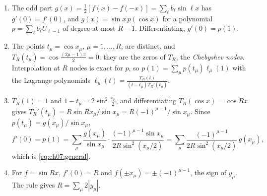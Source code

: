 \documentclass[handoutsbeamer.tex]{subfiles}
\begin{document}
\begin{frame}
\onp{\footnotesize}

\begin{enumerate}\setlength\itemsep{0.2em}
    \item The odd part $g(x) = \frac12[f(x)-f(-x)] = \sum_\ell b_\ell\sin\ell x$ has $g'(0) = f'(0)$, and $g(x) = \sin x\,p(\cos x)$ for a polynomial $p = \sum_\ell b_\ell U_{\ell-1}$ of degree at most $R-1$. Differentiating, $g'(0) = p(1)$.
    \item The points $t_\mu = \cos x_\mu$, $\mu = 1,\dots,R$, are distinct, and $T_R(t_\mu) = \cos\frac{(2\mu-1)\pi}2 = 0$: they are the zeros of $T_R$, the \emph{Chebyshev nodes}. Interpolation at $R$ nodes is exact for $p$, so $p(1) = \sum_\mu p(t_\mu)\ell_\mu(1)$ with the Lagrange polynomials $\ell_\mu(t) = \frac{T_R(t)}{(t-t_\mu)T_R'(t_\mu)}$.
    \item $T_R(1) = 1$ and $1-t_\mu = 2\sin^2\frac{x_\mu}2$, and differentiating $T_R(\cos x) = \cos Rx$ gives $T_R'(t_\mu) = R\sin Rx_\mu/\sin x_\mu = R(-1)^{\mu-1}/\sin x_\mu$. Since $p(t_\mu) = g(x_\mu)/\sin x_\mu$,
    \begin{equation*}
        f'(0) = p(1) = \sum_\mu\frac{g(x_\mu)}{\sin x_\mu}\cdot\frac{(-1)^{\mu-1}\sin x_\mu}{2R\sin^2(x_\mu/2)} = \sum_\mu\frac{(-1)^{\mu-1}}{2R\sin^2(x_\mu/2)}\,g(x_\mu),
    \end{equation*}
    which is \eqref{eq:ch07:general}.
    \item For $f = \sin Rx$, $f'(0) = R$ and $f(\pm x_\mu) = \pm(-1)^{\mu-1}$, the sign of $y_\mu$. The rule gives $R = \sum_\mu2|y_\mu|$.\ona{ \qed}
\end{enumerate}
\end{frame}
\end{document}
